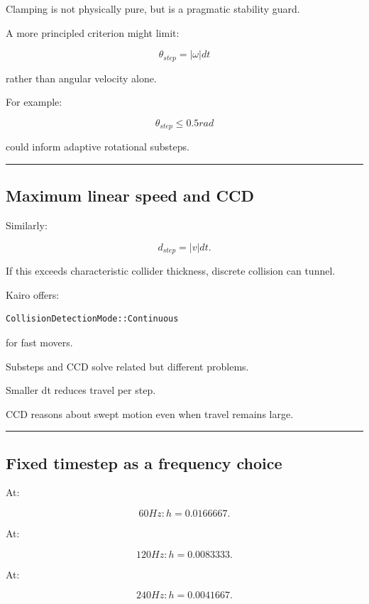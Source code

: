 Clamping is not physically pure, but is a pragmatic stability guard.

A more principled criterion might limit:

\[
\theta_{step}
=
|\omega|dt
\]

rather than angular velocity alone.

For example:

\[
\theta_{step}\le0.5rad
\]

could inform adaptive rotational substeps.

\begin{center}\rule{0.5\linewidth}{0.5pt}\end{center}

\subsection{Maximum linear speed and CCD}\label{06-engine-ii-ch038-maximum-linear-speed-and-ccd}

Similarly:

\[
d_{step}
=
|v|dt.
\]

If this exceeds characteristic collider thickness, discrete collision can tunnel.

Kairo offers:

\begin{verbatim}
CollisionDetectionMode::Continuous
\end{verbatim}

for fast movers.

Substeps and CCD solve related but different problems.

Smaller dt reduces travel per step.

CCD reasons about swept motion even when travel remains large.

\begin{center}\rule{0.5\linewidth}{0.5pt}\end{center}

\subsection{Fixed timestep as a frequency choice}\label{06-engine-ii-ch038-fixed-timestep-as-a-frequency-choice}

At:

\[
60Hz:
h=0.0166667.
\]

At:

\[
120Hz:
h=0.0083333.
\]

At:

\[
240Hz:
h=0.0041667.
\]


